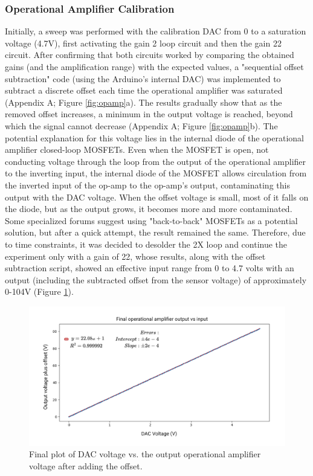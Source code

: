 \documentclass[conference]{IEEEtran}
\begin{document}
      \subsubsection{Operational Amplifier Calibration}
      Initially, a sweep was performed with the calibration DAC from 0 to a saturation voltage (4.7V), first activating the gain 2 loop circuit and then the gain 22 circuit.
       After confirming that both circuits worked by comparing the obtained gains (and the amplification range) with the expected values, a "sequential offset subtraction" code 
       (using the Arduino's internal DAC) was implemented to subtract a discrete offset each time the operational amplifier was saturated (Appendix A; Figure \ref{fig:opamp}a). The results gradually show that as the 
       removed offset increases, a minimum in the output voltage is reached, beyond which the signal cannot decrease (Appendix A; Figure \ref{fig:opamp}b). The potential explanation for this voltage lies in the internal
        diode of the operational amplifier closed-loop MOSFETs. Even when the MOSFET is open, not conducting voltage through the loop from the output of the operational amplifier 
        to the inverting input, the internal diode of the MOSFET allows circulation from the inverted input of the op-amp to the op-amp's output, contaminating this output with the DAC voltage. 
        When the offset voltage is small, most of it falls on the diode, but as the output grows, it becomes more and more contaminated. Some specialized forums suggest using "back-to-back" MOSFETs\cite{BackBackMOSFET} 
        as a potential solution, but after a quick attempt, the result remained the same. Therefore, due to time constraints, it was decided to desolder the 2X loop and continue the experiment only with a 
        gain of 22, whose results, along with the offset subtraction script, showed an effective input range from 0 to 4.7 volts with an output (including the subtracted offset from the sensor voltage) 
        of approximately 0-104V (Figure \ref{fig:finalop}).

        \begin{figure}[!th]
         \centering
         \includegraphics[width=1\linewidth]{images/finalop.png}
         \caption{Final plot of DAC voltage vs. the output operational amplifier voltage after adding the offset.}
         \label{fig:finalop}
      \end{figure}
\end{document}
